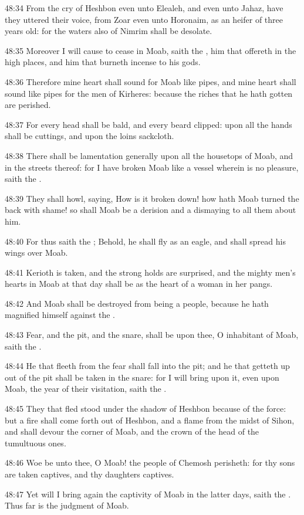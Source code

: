 48:34 From the cry of Heshbon even unto Elealeh, and even unto Jahaz, have they uttered their voice, from Zoar even unto Horonaim, as an heifer of three years old: for the waters also of Nimrim shall be desolate.

48:35 Moreover I will cause to cease in Moab, saith the \LORD, him that offereth in the high places, and him that burneth incense to his gods.

48:36 Therefore mine heart shall sound for Moab like pipes, and mine heart shall sound like pipes for the men of Kirheres: because the riches that he hath gotten are perished.

48:37 For every head shall be bald, and every beard clipped: upon all the hands shall be cuttings, and upon the loins sackcloth.

48:38 There shall be lamentation generally upon all the housetops of Moab, and in the streets thereof: for I have broken Moab like a vessel wherein is no pleasure, saith the \LORD.

48:39 They shall howl, saying, How is it broken down! how hath Moab turned the back with shame! so shall Moab be a derision and a dismaying to all them about him.

48:40 For thus saith the \LORD; Behold, he shall fly as an eagle, and shall spread his wings over Moab.

48:41 Kerioth is taken, and the strong holds are surprised, and the mighty men's hearts in Moab at that day shall be as the heart of a woman in her pangs.

48:42 And Moab shall be destroyed from being a people, because he hath magnified himself against the \LORD.

48:43 Fear, and the pit, and the snare, shall be upon thee, O inhabitant of Moab, saith the \LORD.

48:44 He that fleeth from the fear shall fall into the pit; and he that getteth up out of the pit shall be taken in the snare: for I will bring upon it, even upon Moab, the year of their visitation, saith the \LORD.

48:45 They that fled stood under the shadow of Heshbon because of the force: but a fire shall come forth out of Heshbon, and a flame from the midst of Sihon, and shall devour the corner of Moab, and the crown of the head of the tumultuous ones.

48:46 Woe be unto thee, O Moab! the people of Chemosh perisheth: for thy sons are taken captives, and thy daughters captives.

48:47 Yet will I bring again the captivity of Moab in the latter days, saith the \LORD. Thus far is the judgment of Moab.

